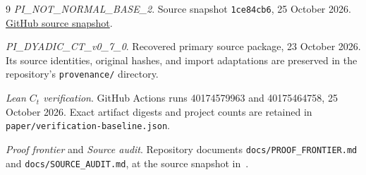 \documentclass[11pt,a4paper]{article}
\theoremstyle{definition}
\theoremstyle{remark}
\newcommand{\code}[1]{{\small\nolinkurl{#1}}}
\begin{document}
\begin{thebibliography}{9}
\textit{PI\_NOT\_NORMAL\_BASE\_2}.
Source snapshot \code{1ce84cb6}, 25 October 2026.
\href{https://github.com/randogelist/PI_NOT_NORMAL_BASE_2/tree/1ce84cb63dc48e43ed92901c29a60f6d07ed4d9b}{GitHub source snapshot}.

\textit{PI\_DYADIC\_CT\_v0\_7\_0}.
Recovered primary source package, 23 October 2026.
Its source identities, original hashes, and import adaptations are
preserved in the repository's \code{provenance/} directory.

\textit{Lean $C_t$ verification}.
GitHub Actions runs 40174579963 and 40175464758,
25 October 2026. Exact artifact digests and project counts are
retained in \code{paper/verification-baseline.json}.

\textit{Proof frontier} and \textit{Source audit}.
Repository documents \code{docs/PROOF_FRONTIER.md} and
\code{docs/SOURCE_AUDIT.md}, at the source snapshot in~\cite{repo}.
\end{thebibliography}
\end{document}
